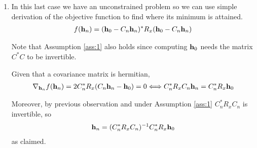 \documentclass{article}
\begin{document}
\begin{enumerate}[label=(\roman*)]
        \item In this last case we have an unconstrained problem so we can use simple derivation of the objective function to find where its minimum is attained.
        \begin{align}
            f(\mathbf{h}_n) = (\mathbf{h}_0 - C_n \mathbf{h}_n )^* R_x (\mathbf{h}_0 - C_n \mathbf{h}_n )
        \end{align}
        
        Note that Assumption \ref{ass:1} also holds since computing $\mathbf{h}_0$ needs the matrix $C^* C$ to be invertible.
        
        Given that a covariance matrix is hermitian,
        \begin{align}
            \nabla_{\mathbf{h}_n} f(\mathbf{h}_n) = 2 C_n^* R_x (C_n \mathbf{h}_n - \mathbf{h}_0) = 0 \Longleftrightarrow C_n^* R_x C_n \mathbf{h}_n =  C_n^* R_x \mathbf{h}_0
        \end{align}
        
        Moreover, by previous observation and under Assumption \ref{ass:1} $C_n^* R_x C_n$ is invertible, so
        \begin{align}
            \mathbf{h}_n = (C_n^* R_x C_n)^{-1} C_n^* R_x \mathbf{h}_0
        \end{align}
        as claimed.
    \end{enumerate}
\end{document}

